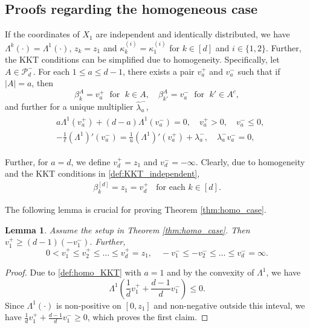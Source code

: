 \documentclass[aap,preprint]{imsart}
\theoremstyle{plain}
\newtheorem{lemma}[theorem]{Lemma}
\theoremstyle{definition}
\begin{document}
\begin{appendix}



\subsection{Proofs regarding the homogeneous case}\label{app:homo_streams}
If the coordinates of $X_1$ are independent and identically distributed, we have $\Lambda^k(\cdot) = \Lambda^{1}(\cdot)$, $z_k = z_1$ and $\kappa_{k}^{(i)} = \kappa_{1}^{(i)}$ for $k \in [d]$ and $i \in \{1,2\}$. Further, the KKT conditions can be simplified due to homogeneity. Specifically, let $A \in \mathcal{P}_{d}^{-}$. For each $1 \leq a \leq d-1$, there exists a pair $v_a^{+}$ and $v_a^{-}$ such that if $|A| = a$, then
$$
\beta^{A}_{k} = v_a^{+}\; \text{ for } \;k \in A,\quad
\beta^{A}_{k'} = v_a^{-}\; \text{ for } \;k' \in A^c,
$$
and further for a unique multiplier $\hat{\lambda}_{a}^{-}$,
\begin{align}\label{def:homo_KKT}
\begin{split}
       &a \Lambda^{1}(v_a^{+}) + (d-a) \Lambda^{1}(v_a^{-}) = 0,\quad v_a^{+} > 0, \quad v_{a}^{-} \leq 0, \\
     & - \frac{1}{\ell} (\Lambda^1)'(v_a^{-}) = \frac{1}{u} (\Lambda^1)'(v_a^{+}) + \lambda_a^{-}, \quad 
   \lambda_a^{-} v_a^{-} = 0,
   \end{split}
\end{align}

Further, for $a = d$, we define $v_d^{+} = z_{1}$ and $v_d^{-} = -\infty$. Clearly, due to homogeneity and the KKT conditions in \eqref{def:KKT_independent}, 
\begin{align*}
    \beta_{k}^{[d]} = z_1 = v_d^{+}\;\;\text{ for each } k \in [d].
\end{align*}


The following lemma is crucial for proving Theorem \ref{thm:homo_case}.

\begin{lemma}\label{lemma:homo_ordering}
Assume the setup in Theorem \ref{thm:homo_case}. Then $v_1^{+} \geq (d-1)(-v_1^{-})$. Further,
$$
0 < v_1^{+} \leq v_2^{+} \leq \ldots \leq v_d^{+} = z_1,\quad
-v_1^{-} \leq -v_2^{-} \leq \ldots \leq v_d^{-} = \infty.
$$
\end{lemma}
\begin{proof}
Due to \eqref{def:homo_KKT} with $a=1$ and by the convexity of $\Lambda^1$, we have
$$
\Lambda^{1}\left(\frac{1}{d} v_1^{+} + \frac{d-1}{d} v_1^{-} \right) \leq 0.
$$
Since $\Lambda^{1}(\cdot)$ is non-positive on $[0,z_1]$ and non-negative outside this inteval, we have
$\frac{1}{d} v_1^{+} + \frac{d-1}{d} v_1^{-} \geq 0$, which proves the first claim.


\end{proof}
\end{appendix}
\end{document}
